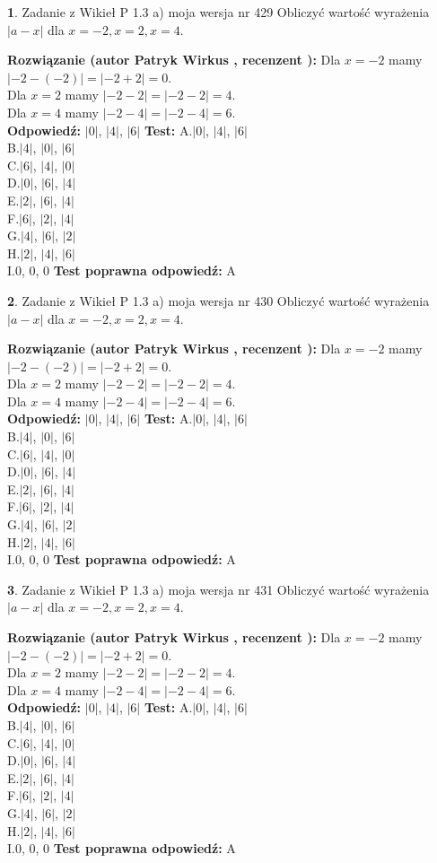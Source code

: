 \documentclass[12pt, a4paper]{article}
\theoremstyle{definition} %
\newtheorem{zad}{}
\newcommand{\zadStart}[1]{\begin{zad}#1\newline}
\newcommand{\zadStop}{\end{zad}}
\newcommand{\rozwStart}[2]{\noindent \textbf{Rozwiązanie (autor #1 , recenzent #2): }\newline}
\newcommand{\rozwStop}{\newline}
\newcommand{\odpStart}{\noindent \textbf{Odpowiedź:}\newline}
\newcommand{\odpStop}{\newline}
\newcommand{\testStart}{\noindent \textbf{Test:}\newline}
\newcommand{\testStop}{\newline}
\newcommand{\kluczStart}{\noindent \textbf{Test poprawna odpowiedź:}\newline}
\newcommand{\kluczStop}{\newline}
\begin{document}
\zadStart{Zadanie z Wikieł P 1.3 a) moja wersja nr 429}
Obliczyć wartość wyrażenia $|a - x|$ dla $x=-2,x=2,x=4$.
\zadStop
\rozwStart{Patryk Wirkus}{}
Dla $x = -2$ mamy $|-2 - (-2)| = |-2 + 2| = 0$.\\
Dla $x = 2$ mamy $|-2 - 2| = |-2 - 2| = 4$.\\
Dla $x = 4$ mamy $|-2 - 4| = |-2 - 4| = 6$.\\
\rozwStop
\odpStart
$|0|$, $|4|$, $|6|$
\odpStop
\testStart
A.$|0|$, $|4|$, $|6|$\\
B.$|4|$, $|0|$, $|6|$\\
C.$|6|$, $|4|$, $|0|$\\
D.$|0|$, $|6|$, $|4|$\\
E.$|2|$, $|6|$, $|4|$\\
F.$|6|$, $|2|$, $|4|$\\
G.$|4|$, $|6|$, $|2|$\\
H.$|2|$, $|4|$, $|6|$\\
I.$0$, $0$, $0$
\testStop
\kluczStart
A
\kluczStop



\zadStart{Zadanie z Wikieł P 1.3 a) moja wersja nr 430}
Obliczyć wartość wyrażenia $|a - x|$ dla $x=-2,x=2,x=4$.
\zadStop
\rozwStart{Patryk Wirkus}{}
Dla $x = -2$ mamy $|-2 - (-2)| = |-2 + 2| = 0$.\\
Dla $x = 2$ mamy $|-2 - 2| = |-2 - 2| = 4$.\\
Dla $x = 4$ mamy $|-2 - 4| = |-2 - 4| = 6$.\\
\rozwStop
\odpStart
$|0|$, $|4|$, $|6|$
\odpStop
\testStart
A.$|0|$, $|4|$, $|6|$\\
B.$|4|$, $|0|$, $|6|$\\
C.$|6|$, $|4|$, $|0|$\\
D.$|0|$, $|6|$, $|4|$\\
E.$|2|$, $|6|$, $|4|$\\
F.$|6|$, $|2|$, $|4|$\\
G.$|4|$, $|6|$, $|2|$\\
H.$|2|$, $|4|$, $|6|$\\
I.$0$, $0$, $0$
\testStop
\kluczStart
A
\kluczStop



\zadStart{Zadanie z Wikieł P 1.3 a) moja wersja nr 431}
Obliczyć wartość wyrażenia $|a - x|$ dla $x=-2,x=2,x=4$.
\zadStop
\rozwStart{Patryk Wirkus}{}
Dla $x = -2$ mamy $|-2 - (-2)| = |-2 + 2| = 0$.\\
Dla $x = 2$ mamy $|-2 - 2| = |-2 - 2| = 4$.\\
Dla $x = 4$ mamy $|-2 - 4| = |-2 - 4| = 6$.\\
\rozwStop
\odpStart
$|0|$, $|4|$, $|6|$
\odpStop
\testStart
A.$|0|$, $|4|$, $|6|$\\
B.$|4|$, $|0|$, $|6|$\\
C.$|6|$, $|4|$, $|0|$\\
D.$|0|$, $|6|$, $|4|$\\
E.$|2|$, $|6|$, $|4|$\\
F.$|6|$, $|2|$, $|4|$\\
G.$|4|$, $|6|$, $|2|$\\
H.$|2|$, $|4|$, $|6|$\\
I.$0$, $0$, $0$
\testStop
\kluczStart
A
\kluczStop
\end{document}
